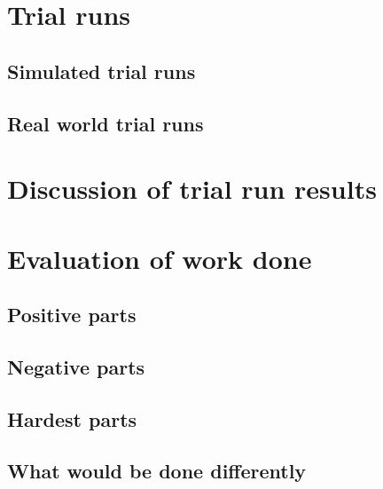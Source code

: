 \documentclass[a4paper,12pt]{article}
\begin{document}
\section{Trial runs}

\subsection{Simulated trial runs}

\subsection{Real world trial runs}

\section{Discussion of trial run results}

\section{Evaluation of work done}

\subsection{Positive parts}

\subsection{Negative parts}

\subsection{Hardest parts}

\subsection{What would be done differently}
\end{document}
